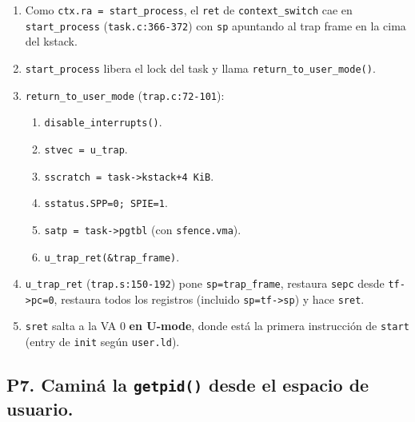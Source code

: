 \documentclass[11pt,a4paper]{article}
\begin{document}
\begin{respuesta}
\begin{enumerate}[leftmargin=*]
    \item Como \texttt{ctx.ra = start\_process}, el \texttt{ret} de
        \texttt{context\_switch} cae en \texttt{start\_process}
        (\texttt{task.c:366-372}) con \texttt{sp} apuntando al trap
        frame en la cima del kstack.
    \item \texttt{start\_process} libera el lock del task y llama
        \texttt{return\_to\_user\_mode()}.
    \item \texttt{return\_to\_user\_mode} (\texttt{trap.c:72-101}):
        \begin{enumerate}[nosep,label=\alph*)]
            \item \texttt{disable\_interrupts()}.
            \item \texttt{stvec = u\_trap}.
            \item \texttt{sscratch = task->kstack+4\,KiB}.
            \item \texttt{sstatus.SPP=0; SPIE=1}.
            \item \texttt{satp = task->pgtbl} (con
                \texttt{sfence.vma}).
            \item \texttt{u\_trap\_ret(\&trap\_frame)}.
        \end{enumerate}
    \item \texttt{u\_trap\_ret} (\texttt{trap.s:150-192}) pone
        \texttt{sp=trap\_frame}, restaura \texttt{sepc} desde
        \texttt{tf->pc=0}, restaura todos los registros (incluido
        \texttt{sp=tf->sp}) y hace \texttt{sret}.
    \item \texttt{sret} salta a la VA 0 \textbf{en U-mode}, donde
        está la primera instrucción de \texttt{start} (entry de
        \texttt{init} según \texttt{user.ld}).
\end{enumerate}
\end{respuesta}

\subsection*{P7. Caminá la \texttt{getpid()} desde el espacio de usuario.}
\end{document}
